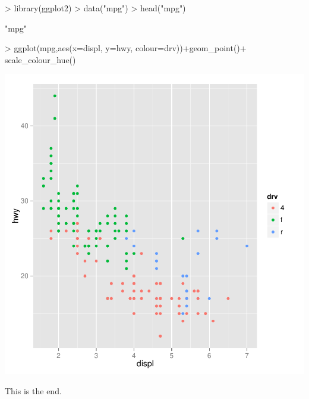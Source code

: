 \documentclass{article}
\begin{document}
\begin{Schunk}
\begin{Sinput}
> library(ggplot2)
> data("mpg")
> head("mpg")
\end{Sinput}
\begin{Soutput}
[1] "mpg"
\end{Soutput}
\begin{Sinput}
> ggplot(mpg,aes(x=displ, y=hwy, colour=drv))+geom_point()+ scale_colour_hue()
\end{Sinput}
\end{Schunk}
\includegraphics{tutorialJY-Cars2}

This is the end.
\end{document}
